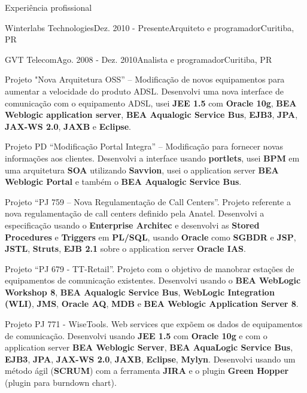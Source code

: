 \documentclass{resume}
\begin{document}
\begin{rSection}{Experiência profissional}
\begin{rSubsection}{Winterlabs Technologies}{Dez. 2010 - Presente}{Arquiteto e programador}{Curitiba, PR}
    \end{rSubsection}
    \begin{rSubsection}{GVT Telecom}{Ago. 2008 - Dez. 2010}{Analista e programador}{Curitiba, PR}
    \item Projeto "Nova Arquitetura OSS” – Modificação de novos equipamentos para aumentar a velocidade do produto ADSL. Desenvolvi uma nova interface de comunicação com o equipamento ADSL, usei \textbf{JEE 1.5} com \textbf{Oracle 10g}, \textbf{BEA Weblogic application server}, \textbf{BEA Aqualogic Service Bus}, \textbf{EJB3}, \textbf{JPA}, \textbf{JAX-WS 2.0}, \textbf{JAXB} e \textbf{Eclipse}.\\
    \item Projeto PD “Modificação Portal Integra” – Modificação para fornecer novas informações aos clientes. Desenvolvi a interface usando \textbf{portlets}, usei \textbf{BPM} em uma arquitetura \textbf{SOA} utilizando \textbf{Savvion}, usei o application server \textbf{BEA Weblogic Portal} e também o \textbf{BEA Aqualogic Service Bus}.\\
    \item Projeto “PJ 759 – Nova Regulamentação de Call Centers”. Projeto referente a nova regulamentação de call centers definido pela Anatel. Desenvolvi a especificação usando o \textbf{Enterprise Architec} e desenvolvi as \textbf{Stored Procedures} e \textbf{Triggers} em \textbf{PL/SQL}, usando \textbf{Oracle} como \textbf{SGBDR} e \textbf{JSP}, \textbf{JSTL}, \textbf{Struts}, \textbf{EJB 2.1} sobre o application server \textbf{Oracle IAS}.\\
    \item Projeto “PJ 679 - TT-Retail”. Projeto com o objetivo de manobrar estações de equipamentos de comunicação existentes. Desenvolvi usando o \textbf{BEA WebLogic Workshop 8}, \textbf{BEA Aqualogic Service Bus}, \textbf{WebLogic Integration (WLI)}, \textbf{JMS}, \textbf{Oracle AQ}, \textbf{MDB} e \textbf{BEA Weblogic Application Server 8}.\\
    \item Projeto PJ 771 - WiseTools. Web services que expõem os dados de equipamentos de comunicação. Desenvolvi usando \textbf{JEE 1.5} com \textbf{Oracle 10g} e com o application server \textbf{BEA Weblogic Server}, \textbf{BEA AquaLogic Service Bus}, \textbf{EJB3}, \textbf{JPA}, \textbf{JAX-WS 2.0}, \textbf{JAXB}, \textbf{Eclipse}, \textbf{Mylyn}. Desenvolvi usando um método ágil (\textbf{SCRUM}) com a ferramenta \textbf{JIRA} e o plugin \textbf{Green Hopper} (plugin para burndown chart).\\

\end{rSubsection}
\end{rSection}
\end{document}
